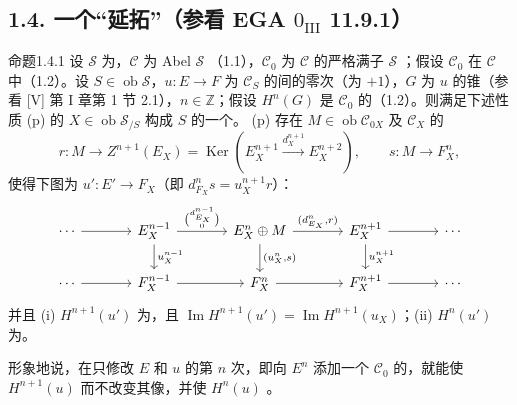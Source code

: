 \subsection*{1.4. 一个“延拓”（参看 EGA $0_{\mathrm{III}}$ 11.9.1）}
\begin{SGAresult}{命题}{1.4.1}
设 $\mathscr S$ 为，$\mathscr C$ 为 Abel $\mathscr S$ （1.1），$\mathscr C_0$ 为 $\mathscr C$ 的严格满子 $\mathscr S$ ；假设 $\mathscr C_0$ 在 $\mathscr C$ 中（1.2）。设 $S\in\operatorname{ob}\mathscr S$，$u:E\to F$ 为 $\mathscr C_S$ 的间的零次（为 $+1$），$G$ 为 $u$ 的锥（参看 [V] 第 I 章第 1 节 2.1），$n\in\mathbb Z$；假设 $H^n(G)$ 是
$\mathscr C_0$ 的（1.2）。则满足下述性质 (p) 的 $X\in\operatorname{ob}\mathscr S_{/S}$ 构成 $S$ 的一个。
(p) 存在 $M\in\operatorname{ob}\mathscr C_{0X}$ 及 $\mathscr C_X$ 的
\[r:M\to Z^{n+1}(E_X)=\operatorname{Ker}(E_X^{n+1}\xrightarrow{d_X^{n+1}}E_X^{n+2}),\qquad s:M\to F_X^n,\]
使得下图为 $u':E'\to F_X$（即 $d_{F_X}^ns=u_X^{n+1}r$）：
\[\begin{tikzcd}[column sep=large]
\cdots\arrow[r]&E_X^{n-1}\arrow[r,"{\binom{d_{E_X}^{n-1}}0}"]\arrow[d,"u_X^{n-1}"]&E_X^n\oplus M\arrow[r,"{(d_{E_X}^n,r)}"]\arrow[d,"{(u_X^n,s)}"]&E_X^{n+1}\arrow[r]\arrow[d,"u_X^{n+1}"]&\cdots\\
\cdots\arrow[r]&F_X^{n-1}\arrow[r]&F_X^n\arrow[r]&F_X^{n+1}\arrow[r]&\cdots
\end{tikzcd}\]
并且 (i) $H^{n+1}(u')$ 为，且 $\operatorname{Im}H^{n+1}(u')=\operatorname{Im}H^{n+1}(u_X)$；(ii) $H^n(u')$ 为。
\end{SGAresult}
形象地说，在只修改 $E$ 和 $u$ 的第 $n$ 次，即向 $E^n$ 添加一个 $\mathscr C_0$ 的，就能使 $H^{n+1}(u)$ 而不改变其像，并使 $H^n(u)$ 。
